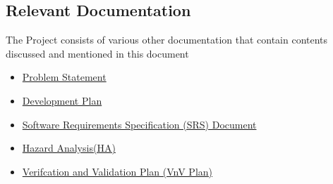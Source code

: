 \documentclass[12pt, titlepage]{article}
\begin{document}


\subsection{Relevant Documentation}

  
The Project consists of various other documentation that contain contents discussed and mentioned in this document
  
\begin{itemize}
    \item \href{https://github.com/SammyG7/Mac-AR/blob/main/docs/ProblemStatementAndGoals/ProblemStatement.pdf}{Problem Statement}
    \item \href{https://github.com/SammyG7/Mac-AR/blob/main/docs/DevelopmentPlan/DevelopmentPlan.pdf}{Development Plan}
    \item \href{https://github.com/SammyG7/Mac-AR/blob/main/docs/SRS/SRS.pdf}{Software Requirements Specification (SRS) Document}
    \item \href{https://github.com/SammyG7/Mac-AR/blob/main/docs/HazardAnalysis/HazardAnalysis.pdf}{Hazard Analysis(HA)}
    \item \href{https://github.com/SammyG7/Mac-AR/blob/main/docs/VnVPlan/VnVPlan.pdf}{Verifcation and Validation Plan (VnV Plan)}
\end{itemize}

\end{document}
